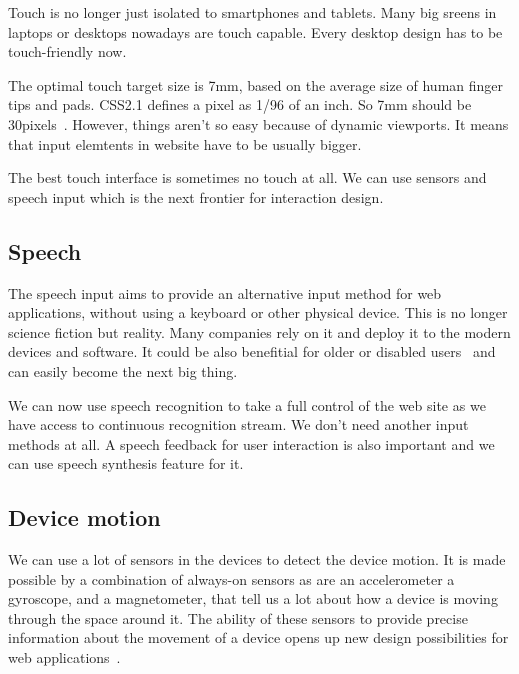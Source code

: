 \documentclass{iitsrc}
\begin{document}
Touch is no longer just isolated to smartphones and tablets. Many big sreens in laptops or desktops nowadays are touch capable. Every desktop design has to be touch-friendly now.

The optimal touch target size is 7mm, based on the average size of human finger tips and pads. CSS2.1 defines a pixel as 1/96 of an inch. So 7mm should be 30pixels~\cite{designingfortouch}. However, things aren’t so easy because of dynamic viewports. It means that input elemtents in website have to be usually bigger.

The best touch interface is sometimes no touch at all. We can use sensors and speech input which is the next frontier for interaction design.


\subsection{Speech} %
\label{sub:speech}

The speech input aims to provide an alternative input method for web applications, without using a keyboard or other physical device. This is no longer science fiction but reality. Many companies rely on it and deploy it to the modern devices and software. It could be also benefitial for older or disabled users~\cite{SpeechRecognition} and can easily become the next big thing.

We can now use speech recognition to take a full control of the web site as we have access to continuous recognition stream. We don't need another input methods at all. A speech feedback for user interaction is also important and we can use speech synthesis feature for it.


\subsection{Device motion} %
\label{sub:device_motion}

We can use a lot of sensors in the devices to detect the device motion. It is made possible by a combination of always-on sensors as are an accelerometer a gyroscope, and a magnetometer, that tell us a lot about how a device is moving through the space around it. The ability of these sensors to provide precise information about the movement of a device opens up new design possibilities for web applications~\cite{ultrabooks}.
\end{document}
